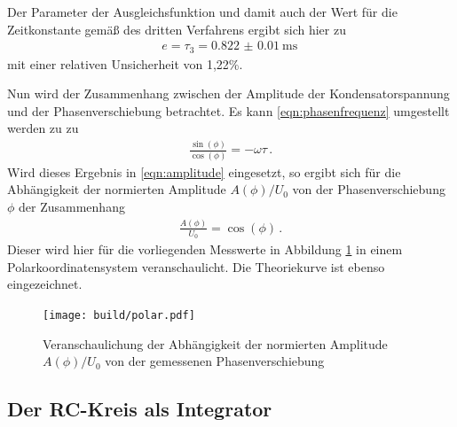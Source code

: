 Der Parameter der Ausgleichsfunktion und damit auch der Wert für die
Zeitkonstante gemäß des dritten Verfahrens ergibt sich hier zu
\begin{align}
  e = \tau_3 = \SI{0.822(0010)}{\milli\second}\,
\end{align}
mit einer relativen Unsicherheit von 1,22\%.

Nun wird der Zusammenhang zwischen der Amplitude der Kondensatorspannung und der Phasenverschiebung betrachtet.
Es kann \eqref{eqn:phasenfrequenz} umgestellt werden zu zu
\begin{align}
  \frac{\sin(\phi)}{\cos(\phi)} = -ω\tau\,.
\end{align}
Wird dieses Ergebnis in \eqref{eqn:amplitude} eingesetzt, so ergibt sich für die Abhängigkeit der normierten
Amplitude $A(\phi)/U_0$ von der Phasenverschiebung $\phi$ der Zusammenhang
\begin{align}
  \frac{A(\phi)}{U_0} = \cos(\phi)\,.
\end{align}
Dieser wird hier für die vorliegenden Messwerte in Abbildung \ref{fig:polarplot} in einem
Polarkoordinatensystem veranschaulicht. Die Theoriekurve ist ebenso eingezeichnet.

\begin{figure}[H]
  \centering
  \texttt{[image: build/polar.pdf]}
  \caption{Veranschaulichung der Abhängigkeit der normierten Amplitude $A(\phi)/U_0$ von der gemessenen Phasenverschiebung}
  \label{fig:polarplot}
\end{figure}

\subsection{Der RC-Kreis als Integrator}

